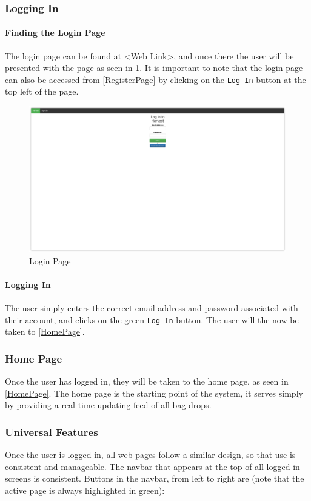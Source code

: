 \documentclass[a4paper,10pt,titlepage]{article}
\begin{document}
\subsubsection{Logging In}
\paragraph{Finding the Login Page}The login page can be found at <Web Link>, and once there the user will be presented with the page as seen in \ref{LoginPage}. It is important to note that the login page can also be accessed from \ref{RegisterPage} by clicking on the \texttt{Log In} button at the top left of the page.

\begin{figure}
 \centering
 \includegraphics[width=12cm, keepaspectratio]{Images/Login-Page.png}
 \caption{Login Page}
 \label{LoginPage}
\end{figure}

\paragraph{Logging In}The user simply enters the correct email address and password associated with their account, and clicks on the green \texttt{Log In} button. The user will the now be taken to \ref{HomePage}.

\subsubsection{Home Page}
Once the user has logged in, they will be taken to the home page, as seen in \ref{HomePage}. The home page is the starting point of the system, it serves simply by providing a real time updating feed of all bag drops.

\subsubsection{Universal Features}
Once the user is logged in, all web pages follow a similar design, so that use is consistent and manageable. The navbar that appears at the top of all logged in screens is consistent. Buttons in the navbar, from left to right are (note that the active page is always highlighted in green): 
\end{document}
